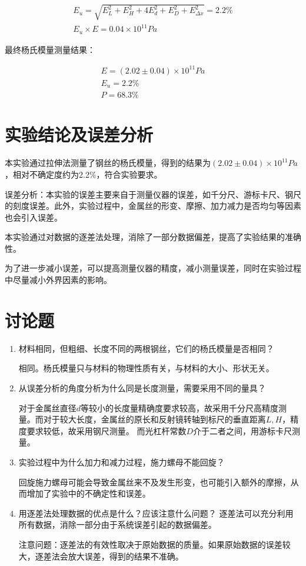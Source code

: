 \documentclass[signature=data]{physicsreport}
\begin{document}
\begin{gather*}
E_u = \sqrt{ E_L^2 + E_H^2 + 4E_d^2 + E_D^2 + E_{\Delta x}^2 } = 2.2\%\\
E_u \times E = 0.04 \times 10^{11}Pa
\end{gather*}

最终杨氏模量测量结果：

\begin{gather*}
E = (2.02 \pm 0.04) \times 10^{11}Pa\\
E_u = 2.2\%\\
P = 68.3\%
\end{gather*}

\section{实验结论及误差分析}
本实验通过拉伸法测量了钢丝的杨氏模量，得到的结果为$(2.02 \pm 0.04) \times 10^{11}Pa$，相对不确定度约为2.2\%，符合实验要求。

误差分析：本实验的误差主要来自于测量仪器的误差，如千分尺、游标卡尺、钢尺的刻度误差。此外，实验过程中，金属丝的形变、摩擦、加力减力是否均匀等因素也会引入误差。

本实验通过对数据的逐差法处理，消除了一部分数据偏差，提高了实验结果的准确性。

为了进一步减小误差，可以提高测量仪器的精度，减小测量误差，同时在实验过程中尽量减小外界因素的影响。

\section{讨论题}
\begin{enumerate}
    \item 材料相同，但粗细、长度不同的两根钢丝，它们的杨氏模量是否相同？
 
    相同。杨氏模量只与材料的物理性质有关，与材料的大小、形状无关。

    \item 从误差分析的角度分析为什么同是长度测量，需要采用不同的量具？
    
    对于金属丝直径$d$等较小的长度量精确度要求较高，故采用千分尺高精度测量。而对于较大长度，金属丝的原长和反射镜转轴到标尺的垂直距离$L,H$，精度要求较低，故采用钢尺测量。
    而光杠杆常数$D$介于二者之间，用游标卡尺测量。

    \item 实验过程中为什么加力和减力过程，施力螺母不能回旋？
    
    回旋施力螺母可能会导致金属丝来不及发生形变，也可能引入额外的摩擦，从而增加了实验中的不确定性和误差。

    \item 用逐差法处理数据的优点是什么？应该注意什么问题？
    逐差法可以充分利用所有数据，消除一部分由于系统误差引起的数据偏差。

    注意问题：逐差法的有效性取决于原始数据的质量。如果原始数据的误差较大，逐差法会放大误差，得到的结果不准确。
\end{enumerate}
\end{document}
